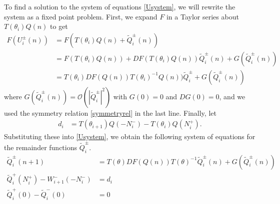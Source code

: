 \documentclass[12pt]{elsarticle}
\begin{document}
To find a solution to the system of equations \eqref{Usystem}, we will rewrite the system as a fixed point problem. First, we expand $F$ in a Taylor series about $T(\theta_i) Q(n)$ to get
\begin{align*}
F(U_i^\pm(n)) &= F(T(\theta_i) Q(n) + \tilde{Q}_i^\pm(n)) \\
&= F(T(\theta_i) Q(n)) + D F(T(\theta_i) Q(n)) \tilde{Q}_i^\pm(n) + G(\tilde{Q}_i^\pm(n)) \\
&= T(\theta_i)DF(Q(n))T(\theta_i)^{-1} Q(n)) \tilde{Q}_i^\pm + G(\tilde{Q}_i^\pm(n))
\end{align*}
where $G(\tilde{Q}_i^\pm(n)) = \mathcal{O}(|\tilde{Q}_i^\pm|^2)$ with $G(0) = 0$ and $DG(0) = 0$, and we used the symmetry relation \eqref{symmetryrel} in the last line. Finally, let
\begin{align} \label{didef}
d_i &= T(\theta_{i+1}) Q(-N_i^-) - T(\theta_i) Q(N_i^+).
\end{align}
Substituting these into \eqref{Usystem}, we obtain the following system of equations for the remainder functions $\tilde{Q}_i^\pm$.
\begin{align}
\tilde{Q}_i^\pm(n+1) &= T(\theta)D F(Q(n))T(\theta)^{-1} \tilde{Q}_i^\pm(n) + G(\tilde{Q}_i^\pm(n)) \label{Wsystem1} \\
\tilde{Q}_i^+(N_i^+) - W_{i+1}^-(-N_i^-) &= d_i \label{Wsystem2} \\
\tilde{Q}_i^+(0) - \tilde{Q}_i^-(0) &= 0 \label{Wsystem3}
\end{align}
\end{document}
